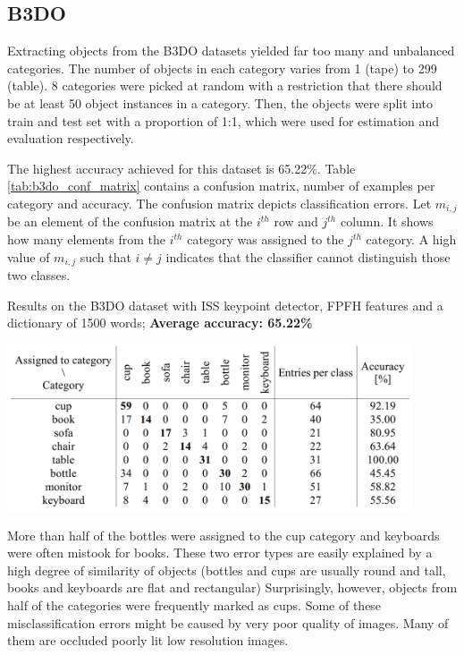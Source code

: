 \documentclass[12pt]{article}
\begin{document}
  \subsection{B3DO}
    Extracting objects from the B3DO datasets yielded far too many and 
unbalanced categories. The number of objects in each category varies from 1 
(tape) to 299 (table). 8 categories were picked at random with a restriction 
that there should be at least 50 object instances in a category. Then, the 
objects were split into train and test set with a proportion of 1:1, which were 
used for estimation and evaluation respectively.

    The highest accuracy achieved for this dataset is 65.22\%. Table 
\ref{tab:b3do_conf_matrix} contains a confusion matrix, number of examples per 
category and accuracy. The confusion matrix depicts classification errors. Let 
$m_{i, j}$ be an element of the confusion matrix at the $i^{th}$ row and 
$j^{th}$ column. It shows how many elements from the $i^{th}$ category was 
assigned to the $j^{th}$ category. A high value of $m_{i, j}$ such that $i \neq 
j$ indicates that the classifier cannot distinguish those two classes.

    \begin{table}[!ht]
    \centering
    \caption{Results on the B3DO dataset with ISS keypoint detector, FPFH 
features and a dictionary of 1500 words; \textbf{Average accuracy: 65.22\%}}
    \includegraphics[width=0.9\textwidth]{figs/b3do_conf_matrix}	
    \label{tab:b3do_conf_matrix}
    \end{table}   

    More than half of the bottles were assigned to the cup category and 
keyboards were often mistook for books. These two error types are easily 
explained by a high degree of similarity of objects (bottles and cups are 
usually round and tall, books and keyboards are flat and rectangular) 
Surprisingly, however, objects from half of the categories were frequently 
marked as cups. Some of these misclassification errors might be caused by very 
poor quality of images. Many of them are occluded poorly lit low resolution 
images.	
\end{document}
